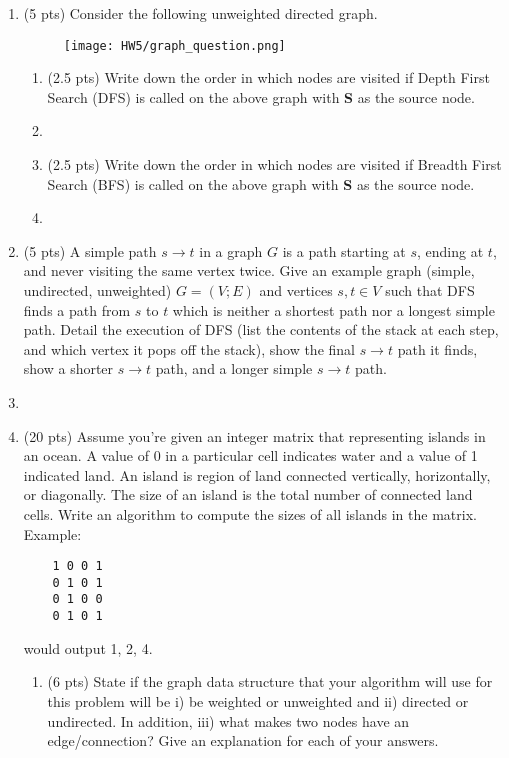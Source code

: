 \documentclass[12pt]{article}
\newcommand{\makenonemptybox}[2]{%
\item[]
\fbox{%
\parbox[c][#1][t]{\dimexpr\linewidth-2\fboxsep-2\fboxrule}{
  \hrule width \hsize height 0pt
  #2
 }%
}%
\par\vspace{\ht\strutbox}
}
\begin{document}
\begin{enumerate}
    
    \item
    (5 pts) Consider the following unweighted directed graph.
    \begin{figure}[h!]
    \begin{center}
    \texttt{[image: HW5/graph\_question.png]}
    \end{center}
    \end{figure}
    \begin{enumerate}
    \item 
    (2.5 pts) Write down the order in which nodes are visited if Depth First Search (DFS) is called on the above graph with \textbf{S} as the source node.\\
    \makenonemptybox{2.5in}{}
    
    \item 
    (2.5 pts) Write down the order in which nodes are visited if Breadth First Search (BFS) is called on the above graph with \textbf{S} as the source node.\\
    \makenonemptybox{3in}{}
    \end{enumerate}
    \clearpage
    \item (5 pts)
    A simple path $s \to t$  in a graph $G$ is a path starting at $s$, ending at $t$, and
never visiting the same vertex twice. Give an example graph (simple, undirected,
unweighted) $G = (V;E)$ and vertices $s, t \in  V$ such that DFS finds a path from $s$ to $t$
which is neither a shortest path nor a longest simple path. Detail the execution of DFS
(list the contents of the stack at each step, and which vertex it pops off the stack),
show the final $s \to t$ path it finds, show a shorter $s \to t$ path, and a longer simple
$s \to t$ path.
    \makenonemptybox{5in}{}
    \clearpage
    \item 
    (20 pts) Assume you're given an integer matrix that representing islands in an ocean. A value of 0 in a particular cell indicates water and a value of 1 indicated land. An island is region of land connected vertically, horizontally, or diagonally.  The size of an island is the total number of connected land cells. Write an algorithm to compute the sizes of all islands in the matrix. Example:
\begin{verbatim}
    1 0 0 1
    0 1 0 1
    0 1 0 0
    0 1 0 1
\end{verbatim}
would output 1, 2, 4.
\begin{enumerate}
    \item (6 pts) State if the graph data structure that your algorithm will use for this problem will be i) be weighted or unweighted and ii) directed or undirected. In addition, iii) what makes two nodes have an edge/connection? Give an explanation for each of your answers. 
    

\end{enumerate}
\end{enumerate}
\end{document}
